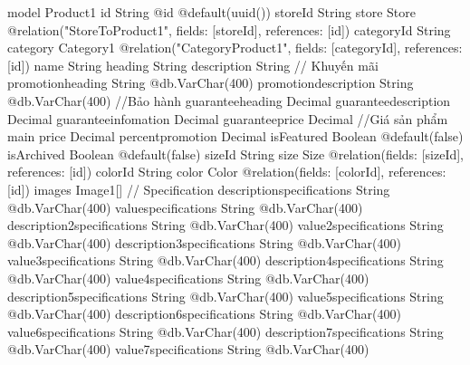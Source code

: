 model Product1 {
  id                           String                         @id @default(uuid())
  storeId                      String
  store                        Store                          @relation("StoreToProduct1", fields: [storeId], references: [id])
  categoryId                   String
  category                     Category1                      @relation("CategoryProduct1", fields: [categoryId], references: [id])
  name                         String
  heading                      String
  description                  String
  // Khuyến mãi
  promotionheading             String                         @db.VarChar(400)
  promotiondescription         String                         @db.VarChar(400)
  //Bảo hành
  guaranteeheading             Decimal
  guaranteedescription         Decimal
  guaranteeinfomation          Decimal
  guaranteeprice               Decimal
  //Giá sản phẩm main
  price                        Decimal
  percentpromotion             Decimal
  isFeatured                   Boolean                        @default(false)
  isArchived                   Boolean                        @default(false)
  sizeId                       String
  size                         Size                           @relation(fields: [sizeId], references: [id])
  colorId                      String
  color                        Color                          @relation(fields: [colorId], references: [id])
  images                       Image1[]
  // Specification
  descriptionspecifications    String                         @db.VarChar(400)
  valuespecifications          String                         @db.VarChar(400)
  description2specifications   String                         @db.VarChar(400)
  value2specifications         String                         @db.VarChar(400)
  description3specifications   String                         @db.VarChar(400)
  value3specifications         String                         @db.VarChar(400)
  description4specifications   String                         @db.VarChar(400)
  value4specifications         String                         @db.VarChar(400)
  description5specifications   String                         @db.VarChar(400)
  value5specifications         String                         @db.VarChar(400)
  description6specifications   String                         @db.VarChar(400)
  value6specifications         String                         @db.VarChar(400)
  description7specifications   String                         @db.VarChar(400)
  value7specifications         String                         @db.VarChar(400)
}
